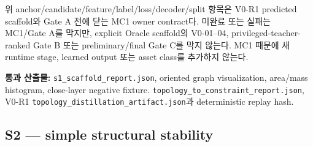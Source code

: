 \documentclass[10pt]{article}
\newcommand{\code}[1]{{\small\nolinkurl{#1}}}
\newcommand{\pass}[1]{\textcolor{GateGreen}{\textbf{#1}}}
\begin{document}
위 anchor/candidate/feature/label/loss/decoder/split 항목은 V0-R1 predicted scaffold와
Gate A 전에 닫는 MC1 owner contract다. 미완료 또는 실패는 MC1/Gate A를 막지만,
explicit Oracle scaffold의 V0-01--04, privileged-teacher-ranked Gate B 또는
preliminary/final Gate C를 막지 않는다.
MC1 때문에 새 runtime stage, learned output 또는 asset class를 추가하지 않는다.

\pass{통과 산출물:} \code{s1\_scaffold\_report.json}, oriented graph visualization,
area/mass histogram, close-layer negative fixture.\newline
\code{topology\_to\_constraint\_report.json}, V0-R1 \code{topology\_distillation\_artifact.json}과
deterministic replay hash.

\subsection{S2 --- simple structural stability}
\end{document}
